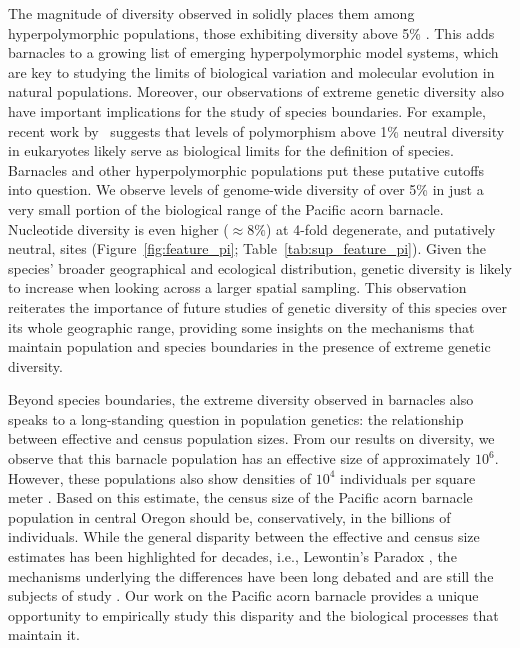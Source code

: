 The magnitude of diversity observed in \bgla{} solidly places them among
hyperpolymorphic populations, those exhibiting diversity above 5\%
\citep{cutter_molecular_2013}. This adds barnacles to a growing list of emerging
hyperpolymorphic model systems, which are key to studying the limits of biological
variation and molecular evolution in natural populations. Moreover, our observations
of extreme genetic diversity also have important implications for the study of species
boundaries. For example, recent work by~\citet{hart_genomic_2025} suggests that levels
of polymorphism above 1\% neutral diversity in eukaryotes likely serve as biological limits
for the definition of species. Barnacles and other hyperpolymorphic populations put these
putative cutoffs into question. We observe levels of genome-wide diversity of over 5\%
in just a very small portion of the biological range of the Pacific acorn barnacle.
Nucleotide diversity is even higher ($\approx8\%$) at 4-fold degenerate, and putatively
neutral, sites (Figure~\ref{fig:feature_pi}; Table~\ref{tab:sup_feature_pi}).
Given the species' broader geographical and ecological distribution, genetic
diversity is likely to increase when looking across a larger spatial sampling.
This observation reiterates the importance of future studies of genetic diversity
of this species over its whole geographic range, providing some insights on
the mechanisms that maintain population and species boundaries in the presence
of extreme genetic diversity.
\vspace{0.1cm}

Beyond species boundaries, the extreme diversity observed in barnacles also speaks to
a long-standing question in population genetics: the relationship between effective
and census population sizes. From our results on diversity, we
observe that this barnacle population has an effective size of approximately $10^{6}$.
However, these populations also show densities of $10^{4}$ individuals per square meter
\citep{menge_recruitment_2000}. Based on this estimate, the census size of the Pacific
acorn barnacle population in central Oregon should be, conservatively, in the billions of
individuals. While the general disparity between the effective and census size estimates
has been highlighted for decades, i.e., Lewontin's Paradox \citep{lewontin_genetic_1974},
the mechanisms underlying the differences have been long debated
\citep{gillespie_role_1999,gillespie_genetic_2000,smith_hitch-hiking_1974,
kimura_neutral_1983} and are still the subjects of study \citep{buffalo_quantifying_2021}.
Our work on the Pacific acorn barnacle provides a unique opportunity to empirically
study this disparity and the biological processes that maintain it.
